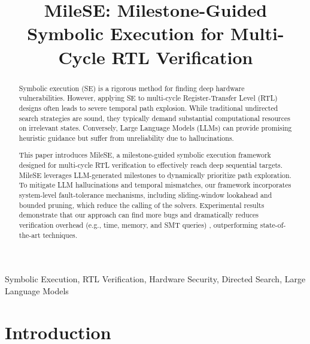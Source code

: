 \documentclass[conference]{IEEEtran}
\begin{document}
\title{MileSE: Milestone-Guided Symbolic Execution for Multi-Cycle RTL Verification}

\IEEEspecialpapernotice{\vspace{-2em}}
\IEEEaftertitletext{}

\maketitle

\begin{abstract}
Symbolic execution (SE) is a rigorous method for finding deep hardware vulnerabilities. However, applying SE to multi-cycle Register-Transfer Level (RTL) designs often leads to severe temporal path explosion. While traditional undirected search strategies are sound, they typically demand substantial computational resources on irrelevant states. Conversely, Large Language Models (LLMs) can provide promising heuristic guidance but suffer from unreliability due to hallucinations.

This paper introduces MileSE, a milestone-guided symbolic execution framework designed for multi-cycle RTL verification to effectively reach deep sequential targets. MileSE leverages LLM-generated milestones to dynamically prioritize path exploration. To mitigate LLM hallucinations and temporal mismatches, our framework incorporates system-level fault-tolerance mechanisms, including sliding-window lookahead and bounded pruning, which reduce the calling of the solvers. Experimental results demonstrate that our approach can find more bugs and dramatically reduces verification overhead (e.g., time, memory, and SMT queries) , outperforming state-of-the-art techniques.
\end{abstract}

\begin{IEEEkeywords}
Symbolic Execution, RTL Verification, Hardware Security, Directed Search, Large Language Models
\end{IEEEkeywords}

\section{Introduction}
\label{sec:intro}
\end{document}

